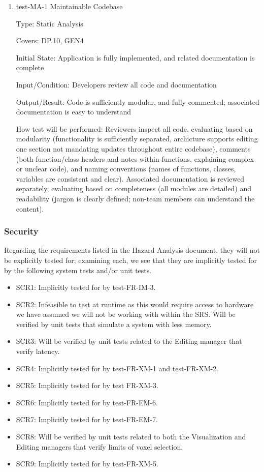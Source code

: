 \documentclass[12pt, titlepage]{article}
\begin{document}
\begin{enumerate}

\item{test-MA-1 Maintainable Codebase\\}

Type: Static Analysis

Covers: DP.10, GEN4 %
					
Initial State: Application is fully implemented, and related documentation is complete
					
Input/Condition: Developers review all code and documentation
					
Output/Result: Code is sufficiently modular, and fully commented; associated documentation is easy to understand
					
How test will be performed: Reviewers inspect all code, evaluating based on modularity (functionality is sufficiently separated,
archicture supports editing one section not mandating updates throughout entire codebase), comments (both function/class headers and notes 
within functions, explaining complex or unclear code), and naming conventions (names of functions, classes, variables are consistent
and clear). Associated documentation is reviewed separately, evaluating based on completeness (all modules are detailed) and readability
(jargon is clearly defined; non-team members can understand the content).

\end{enumerate}

\subsubsection{Security}

Regarding the requirements listed in the Hazard Analysis document, they will not be explicitly tested for; examining each, we see that they
are implicitly tested for by the following system tests and/or unit tests.

\begin{itemize}
  \item SCR1: Implicitly tested for by test-FR-IM-3.
  \item SCR2: Infeasible to test at runtime as this would require access to hardware we have assumed we will not be working with within the SRS.
  Will be verified by unit tests that simulate a system with less memory.
  \item SCR3: Will be verified by unit tests related to the Editing manager that verify latency.
  \item SCR4: Implicitly tested for by test-FR-XM-1 and test-FR-XM-2.
  \item SCR5: Implicitly tested for by test FR-XM-3.
  \item SCR6: Implicitly tested for by test-FR-EM-6.
  \item SCR7: Implicitly tested for by test-FR-EM-7.
  \item SCR8: Will be verified by unit tests related to both the Visualization and Editing managers that verify limits of voxel selection.
  \item SCR9: Implicitly tested for by test-FR-XM-5.
\end{itemize}
\end{document}
